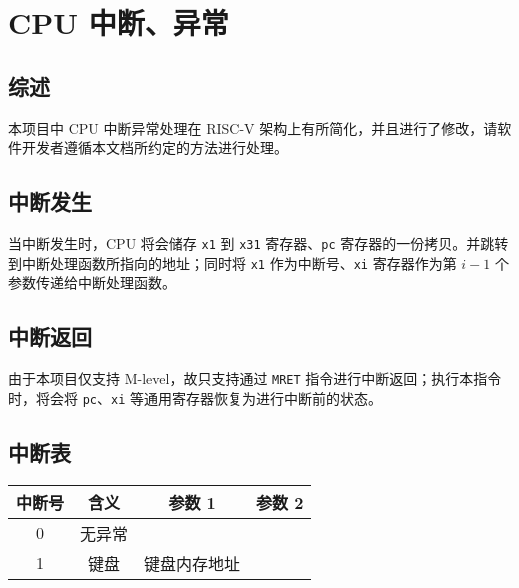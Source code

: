 
\chapter{CPU 中断、异常}

\section{综述}
本项目中 CPU 中断异常处理在 RISC-V 架构上有所简化，并且进行了修改，请软件开发者遵循本文档所约定的方法进行处理。

\section{中断发生}

当中断发生时，CPU 将会储存 \texttt{x1} 到 \texttt{x31} 寄存器、\texttt{pc} 寄存器的一份拷贝。并跳转到中断处理函数所指向的地址；同时将 \texttt{x1} 作为中断号、\texttt{xi} 寄存器作为第 $i-1$ 个参数传递给中断处理函数。

\section{中断返回}

由于本项目仅支持 M-level，故只支持通过 \texttt{MRET} 指令进行中断返回；执行本指令时，将会将 \texttt{pc}、\texttt{xi} 等通用寄存器恢复为进行中断前的状态。

\section{中断表}
\begin{tabular}{|c|c|c|c|}
    \hline
    中断号 & 含义 & 参数 1 & 参数 2\\\hline
    0     & 无异常 & &\\\hline
    1     & 键盘 & 键盘内存地址 &\\\hline
\end{tabular}